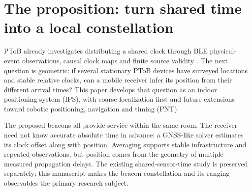 \documentclass[11pt,letterpaper]{article}
\begin{document}
\section{The proposition: turn shared time into a local constellation}
PToB already investigates distributing a shared clock through BLE physical-event observations, causal clock maps and finite source validity \cite{viability,implementation}. The next question is geometric: if several stationary PToB devices have surveyed locations and stable relative clocks, can a mobile receiver infer its position from their different arrival times? This paper develops that question as an indoor positioning system (IPS), with coarse localization first and future extensions toward robotic positioning, navigation and timing (PNT).

The proposed beacons all provide service within the same room. The receiver need not know accurate absolute time in advance: a GNSS-like solver estimates its clock offset along with position. Averaging supports stable infrastructure and repeated observations, but position comes from the geometry of multiple measured propagation delays. The existing shared-sensor-time study is preserved separately; this manuscript makes the beacon constellation and its ranging observables the primary research subject.

\newpage
\end{document}
